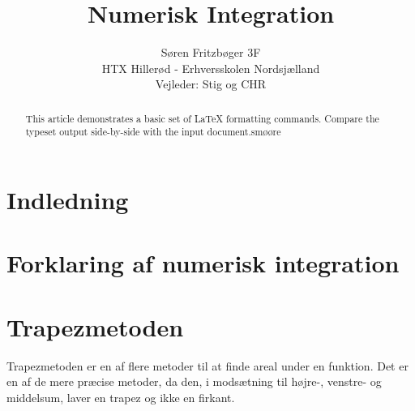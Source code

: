 \documentclass[12pt]{article}
\numberwithin{equation}{section}
\begin{document}
\title{Numerisk Integration}
\author{Søren Fritzbøger 3F\\
HTX Hillerød - Erhversskolen Nordsjælland\\
Vejleder: Stig og CHR}
\renewcommand{\today}{2. Februar 2015}
\maketitle

\begin{abstract}
This article demonstrates a basic set of LaTeX formatting commands.
Compare the typeset output side-by-side with the input document.smøøre
\end{abstract}
\newpage
\tableofcontents
\newpage
\section{Indledning}

\section{Forklaring af numerisk integration}



\section{Trapezmetoden}
\label{sec:trapezmetoden}
Trapezmetoden er en af flere metoder til at finde areal under en funktion. Det er en af de mere præcise metoder, da den, i modsætning til højre-, venstre- og middelsum, laver en trapez og ikke en firkant.
\end{document}
